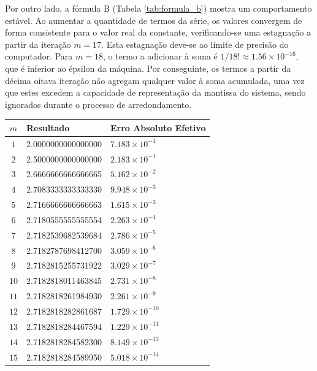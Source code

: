 \documentclass{article}
\begin{document}
Por outro lado, a fórmula B (Tabela \ref{tab:formula_b}) mostra um 
comportamento estável. Ao aumentar a quantidade de termos da série, 
os valores convergem de forma consistente para o valor real da constante, 
verificando-se uma estagnação a partir da iteração $m=17$. Esta estagnação 
deve-se ao limite de precisão do computador. Para $m=18$, o termo a 
adicionar à soma é $1/18! \approx 1.56 \times 10^{-16}$, que é inferior 
ao épsilon da máquina. Por conseguinte, os termos a partir da décima
oitava iteração não agregam qualquer valor à soma acumulada, uma vez que 
estes excedem a capacidade de representação da mantissa do sistema, sendo 
ignorados durante o processo de arredondamento.
\bigskip

\begin{table}[H]
    \centering
    \begin{tabular}{|c|l|l|}
        \hline
        \textbf{$m$} & \textbf{Resultado} & \textbf{Erro Absoluto Efetivo} \\ \hline
        $1$  & 2.0000000000000000 & $7.183 \times 10^{-1}$ \\ \hline
        $2$  & 2.5000000000000000 & $2.183 \times 10^{-1}$ \\ \hline
        $3$  & 2.6666666666666665 & $5.162 \times 10^{-2}$ \\ \hline
        $4$  & 2.7083333333333330 & $9.948 \times 10^{-3}$ \\ \hline
        $5$  & 2.7166666666666663 & $1.615 \times 10^{-3}$ \\ \hline
        $6$  & 2.7180555555555554 & $2.263 \times 10^{-4}$ \\ \hline
        $7$  & 2.7182539682539684 & $2.786 \times 10^{-5}$ \\ \hline
        $8$  & 2.7182787698412700 & $3.059 \times 10^{-6}$ \\ \hline
        $9$  & 2.7182815255731922 & $3.029 \times 10^{-7}$ \\ \hline
        $10$ & 2.7182818011463845 & $2.731 \times 10^{-8}$ \\ \hline
        $11$ & 2.7182818261984930 & $2.261 \times 10^{-9}$ \\ \hline
        $12$ & 2.7182818282861687 & $1.729 \times 10^{-10}$ \\ \hline
        $13$ & 2.7182818284467594 & $1.229 \times 10^{-11}$ \\ \hline
        $14$ & 2.7182818284582300 & $8.149 \times 10^{-13}$ \\ \hline
        $15$ & 2.7182818284589950 & $5.018 \times 10^{-14}$ \\ \hline

\end{tabular}
\end{table}
\end{document}

